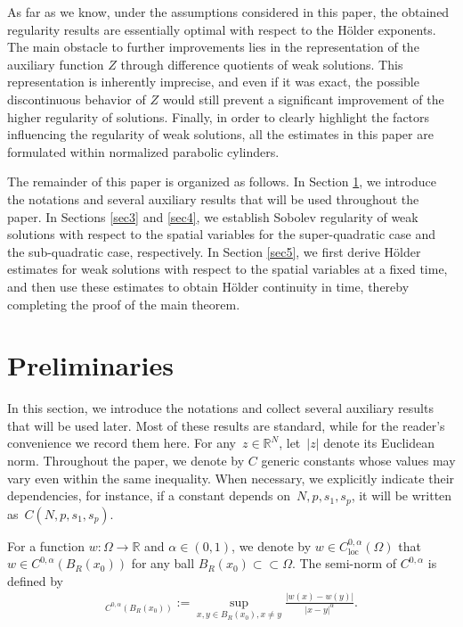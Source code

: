 \documentclass[reqno,10pt]{amsart}
\numberwithin{equation}{section}
\begin{document}
As far as we know, under the assumptions considered in this paper, the obtained regularity results are essentially optimal with respect to the H\"{o}lder exponents.
The main obstacle to further improvements lies in the representation of the auxiliary function $Z$ through difference quotients of weak solutions. This representation is inherently imprecise, and even if it was exact, the possible discontinuous behavior of $Z$ would still prevent a significant improvement of the higher regularity of solutions. Finally, in order to clearly highlight the factors influencing the regularity of weak solutions, all the estimates in this paper are formulated within normalized parabolic cylinders.

\smallskip

The remainder of this paper is organized as follows. In Section \ref{sec2}, we introduce the notations and several auxiliary results that will be used throughout the paper. In Sections \ref{sec3} and \ref{sec4}, we establish Sobolev regularity of weak solutions with respect to the spatial variables for the super-quadratic case and the sub-quadratic case, respectively. In Section \ref{sec5}, we first derive H\"{o}lder estimates for weak solutions with respect to the spatial variables at a fixed time, and then use these estimates to obtain H\"{o}lder continuity in time, thereby completing the proof of the main theorem.

\section{Preliminaries}
\label{sec2}
In this section, we introduce the notations and collect several auxiliary results that will be used later. Most of these results are standard, while for the reader’s convenience we record them here. For any $z \in \mathbb{R}^N$, let $|z|$ denote its Euclidean norm. Throughout the paper, we denote by $C$  generic constants whose values may vary even within the same inequality. When necessary, we explicitly indicate their dependencies, for instance, if a constant depends on $N, p, s_1, s_p$, it will be written as $C(N, p, s_1, s_p)$.

For a function $w: \Omega\rightarrow \mathbb{R}$ and $\alpha\in (0, 1)$, we denote by $w\in C^{0, \alpha}_\mathrm{loc}(\Omega)$ that $w\in C^{0, \alpha}\left(B_R(x_0)\right)$ for any ball $B_R(x_0)\subset\subset \Omega$. The semi-norm of $C^{0, \alpha}$ is defined by
\begin{align*}
	[w]_{C^{0, \alpha}\left(B_R(x_0)\right)}:=\sup\limits_{x, y\in B_R(x_0),  x\neq y}\frac{|w(x)-w(y)|}{|x-y|^\alpha}.
\end{align*}
\end{document}
